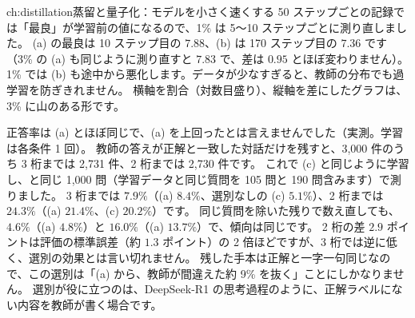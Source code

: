 \begin{answers}{ch:distillation}{蒸留と量子化：モデルを小さく速くする}
50 ステップごとの記録では「最良」が学習前の値になるので、1\% は 5〜10 ステップごとに測り直しました。
(a) の最良は 10 ステップ目の $7.88$、(b) は 170 ステップ目の $7.36$ です（3\% の (a) も同じように測り直すと $7.83$ で、差は $0.95$ とほぼ変わりません）。
1\% では (b) も途中から悪化します。データが少なすぎると、教師の分布でも過学習を防ぎきれません。
横軸を割合（対数目盛り）、縦軸を差にしたグラフは、3\% に山のある形です。
\item 正答率は (a) とほぼ同じで、(a) を上回ったとは言えませんでした（実測。学習は各条件 1 回）。
教師の答えが正解と一致した対話だけを残すと、3,000 件のうち 3 桁までは 2,731 件、2 桁までは 2,730 件です。
これで (c) と同じように学習し、と同じ 1,000 問（学習データと同じ質問を 105 問と 190 問含みます）で測りました。
3 桁までは $7.9\%$（(a) $8.4\%$、選別なしの (c) $5.1\%$）、2 桁までは $24.3\%$（(a) $21.4\%$、(c) $20.2\%$）です。
同じ質問を除いた残りで数え直しても、$4.6\%$（(a) $4.8\%$）と $16.0\%$（(a) $13.7\%$）で、傾向は同じです。
2 桁の差 $2.9$ ポイントは評価の標準誤差（約 $1.3$ ポイント）の 2 倍ほどですが、3 桁では逆に低く、選別の効果とは言い切れません。
残した手本は正解と一字一句同じなので、この選別は「(a) から、教師が間違えた約 9\% を抜く」ことにしかなりません。
選別が役に立つのは、DeepSeek-R1 の思考過程のように、正解ラベルにない内容を教師が書く場合です。
\end{answers}
